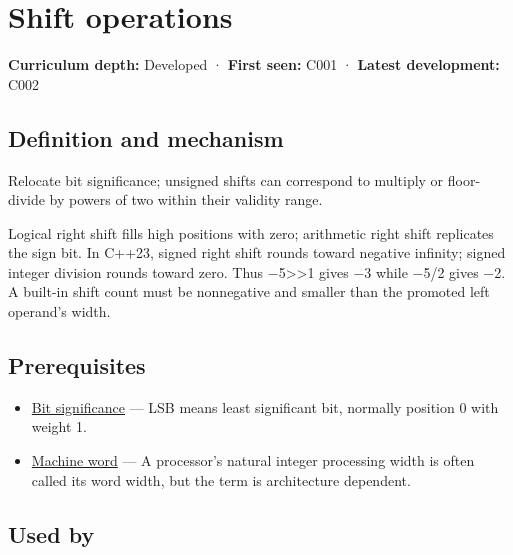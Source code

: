 \hypertarget{appendix-73425b25118e}{}\label{referencestart:appendix-73425b25118e}
\section{Shift operations}\label{appendix-73425b25118e-shift-operations}

\textbf{Curriculum depth:} Developed · \textbf{First seen:} C001 · \textbf{Latest development:} C002

\subsection{Definition and mechanism}\label{appendix-73425b25118e-definition-and-mechanism}

Relocate bit significance; unsigned shifts can correspond to multiply or floor-divide by powers of two within their validity range.

Logical right shift fills high positions with zero; arithmetic right shift replicates the sign bit. In C++23, signed right shift rounds toward negative infinity; signed integer division rounds toward zero. Thus −5\textgreater\textgreater1 gives −3 while −5/2 gives −2. A built-in shift count must be nonnegative and smaller than the promoted left operand's width.

\subsection{Prerequisites}\label{appendix-73425b25118e-prerequisites}

\begin{itemize}
\tightlist
\item
  \hyperref[appendix-280445746493]{Bit significance} --- LSB means least significant bit, normally position 0 with weight 1.
\item
  \hyperref[appendix-d67a19507dc5]{Machine word} --- A processor's natural integer processing width is often called its word width, but the term is architecture dependent.
\end{itemize}

\subsection{Used by}\label{appendix-73425b25118e-used-by}

